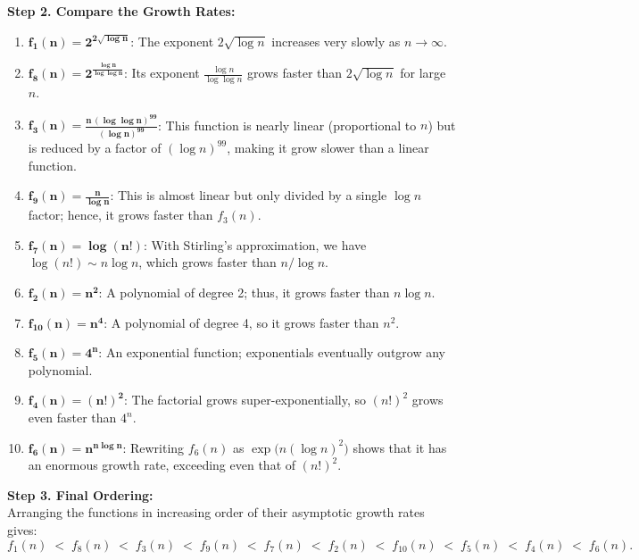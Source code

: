 \documentclass[12pt]{article}
\begin{document}
\bigskip
\noindent \textbf{Step 2. Compare the Growth Rates:}

\begin{enumerate}
    \item \(\boldsymbol{f_1(n)=2^{2\sqrt{\log n}}}\):  
    The exponent \(2\sqrt{\log n}\) increases very slowly as \(n\to\infty\).

    \item \(\boldsymbol{f_8(n)=2^{\frac{\log n}{\log \log n}}}\):  
    Its exponent \(\frac{\log n}{\log \log n}\) grows faster than \(2\sqrt{\log n}\) for large \(n\).

    \item \(\boldsymbol{f_3(n)=\frac{n\,(\log \log n)^{99}}{(\log n)^{99}}}\):  
    This function is nearly linear (proportional to \(n\)) but is reduced by a factor of \((\log n)^{99}\), making it grow slower than a linear function.

    \item \(\boldsymbol{f_9(n)=\frac{n}{\log n}}\):  
    This is almost linear but only divided by a single \(\log n\) factor; hence, it grows faster than \(f_3(n)\).

    \item \(\boldsymbol{f_7(n)=\log(n!)}\):  
    With Stirling's approximation, we have \(\log(n!)\sim n\log n\), which grows faster than \(n/\log n\).

    \item \(\boldsymbol{f_2(n)=n^2}\):  
    A polynomial of degree 2; thus, it grows faster than \(n\log n\).

    \item \(\boldsymbol{f_{10}(n)=n^4}\):  
    A polynomial of degree 4, so it grows faster than \(n^2\).

    \item \(\boldsymbol{f_5(n)=4^n}\):  
    An exponential function; exponentials eventually outgrow any polynomial.

    \item \(\boldsymbol{f_4(n)=(n!)^2}\):  
    The factorial grows super-exponentially, so \((n!)^2\) grows even faster than \(4^n\).

    \item \(\boldsymbol{f_6(n)=n^{n \log n}}\):  
    Rewriting \(f_6(n)\) as \(\exp\bigl(n(\log n)^2\bigr)\) shows that it has an enormous growth rate, exceeding even that of \((n!)^2\).
\end{enumerate}

\bigskip
\noindent \textbf{Step 3. Final Ordering:}\\[0.5em]
Arranging the functions in increasing order of their asymptotic growth rates gives:
\[
\boxed{
f_1(n) \;<\; f_8(n) \;<\; f_3(n) \;<\; f_9(n) \;<\; f_7(n) \;<\; f_2(n) \;<\; f_{10}(n) \;<\; f_5(n) \;<\; f_4(n) \;<\; f_6(n).
}
\]
\end{document}
